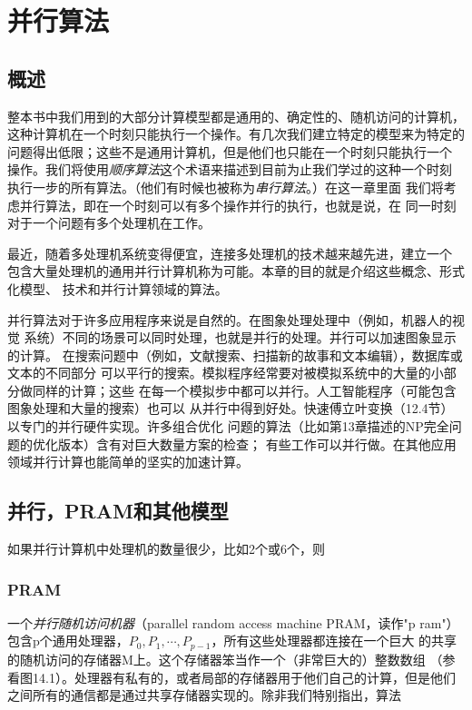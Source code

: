 \chapter{并行算法}\label{Sec:Chapter:ParallelAlgorithm}
\section{概述}
整本书中我们用到的大部分计算模型都是通用的、确定性的、随机访问的计算机，
这种计算机在一个时刻只能执行一个操作。有几次我们建立特定的模型来为特定的
问题得出低限；这些不是通用计算机，但是他们也只能在一个时刻只能执行一个
操作。我们将使用\emph{顺序算法}这个术语来描述到目前为止我们学过的这种一个时刻
执行一步的所有算法。（他们有时候也被称为\emph{串行算法}。）在这一章里面
我们将考虑并行算法，即在一个时刻可以有多个操作并行的执行，也就是说，在
同一时刻对于一个问题有多个处理机在工作。

最近，随着多处理机系统变得便宜，连接多处理机的技术越来越先进，建立一个
包含大量处理机的通用并行计算机称为可能。本章的目的就是介绍这些概念、形式化模型、
技术和并行计算领域的算法。

并行算法对于许多应用程序来说是自然的。在图象处理处理中（例如，机器人的视觉
系统）不同的场景可以同时处理，也就是并行的处理。并行可以加速图象显示的计算。
在搜索问题中（例如，文献搜索、扫描新的故事和文本编辑），数据库或文本的不同部分
可以平行的搜索。模拟程序经常要对被模拟系统中的大量的小部分做同样的计算；这些
在每一个模拟步中都可以并行。人工智能程序（可能包含图象处理和大量的搜索）也可以
从并行中得到好处。快速傅立叶变换（12.4节）以专门的并行硬件实现。许多组合优化
问题的算法（比如第13章描述的NP完全问题的优化版本）含有对巨大数量方案的检查；
有些工作可以并行做。在其他应用领域并行计算也能简单的坚实的加速计算。


\section{并行，PRAM和其他模型}
如果并行计算机中处理机的数量很少，比如2个或6个，则
\subsection{PRAM}
一个\emph{并行随机访问机器}（parallel random access machine PRAM，读作"p ram"）
包含p个通用处理器，$P_0,P_1, \cdots, P_{p-1}$，所有这些处理器都连接在一个巨大
的共享的随机访问的存储器M上。这个存储器笨当作一个（非常巨大的）整数数组
（参看图14.1）。处理器有私有的，或者局部的存储器用于他们自己的计算，但是他们
之间所有的通信都是通过共享存储器实现的。除非我们特别指出，算法

